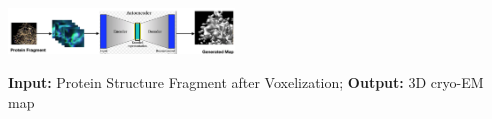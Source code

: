         \begin{tikzfigure}
           \includegraphics[width=0.45\textwidth]{VAE.png}
        \end{tikzfigure}
\textbf{Input:} Protein Structure Fragment after Voxelization; 
\textbf{Output:} 3D cryo-EM map